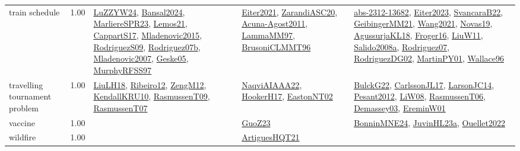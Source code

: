{\begin{longtable}{p{3cm}r>{\raggedright\arraybackslash}p{6cm}>{\raggedright\arraybackslash}p{6cm}>{\raggedright\arraybackslash}p{8cm}}
\index{train schedule}\index{ApplicationAreas!train schedule}train schedule &  1.00 & \hyperref[detail:LuZZYW24]{LuZZYW24}, \hyperref[detail:Bansal2024]{Bansal2024}, \hyperref[detail:MarliereSPR23]{MarliereSPR23}, \hyperref[detail:Lemos21]{Lemos21}, \hyperref[detail:CappartS17]{CappartS17}, \hyperref[detail:Mladenovic2015]{Mladenovic2015}, \hyperref[detail:RodriguezS09]{RodriguezS09}, \hyperref[detail:Rodriguez07b]{Rodriguez07b}, \hyperref[detail:Mladenovic2007]{Mladenovic2007}, \hyperref[detail:Geske05]{Geske05}, \hyperref[detail:MurphyRFSS97]{MurphyRFSS97} & \hyperref[detail:Eiter2021]{Eiter2021}, \hyperref[detail:ZarandiASC20]{ZarandiASC20}, \hyperref[detail:Acuna-Agost2011]{Acuna-Agost2011}, \hyperref[detail:LammaMM97]{LammaMM97}, \hyperref[detail:BrusoniCLMMT96]{BrusoniCLMMT96} & \hyperref[detail:abs-2312-13682]{abs-2312-13682}, \hyperref[detail:Eiter2023]{Eiter2023}, \hyperref[detail:SvancaraB22]{SvancaraB22}, \hyperref[detail:GeibingerMM21]{GeibingerMM21}, \hyperref[detail:Wang2021]{Wang2021}, \hyperref[detail:Novas19]{Novas19}, \hyperref[detail:AgussurjaKL18]{AgussurjaKL18}, \hyperref[detail:Froger16]{Froger16}, \hyperref[detail:LiuW11]{LiuW11}, \hyperref[detail:Salido2008a]{Salido2008a}, \hyperref[detail:Rodriguez07]{Rodriguez07}, \hyperref[detail:RodriguezDG02]{RodriguezDG02}, \hyperref[detail:MartinPY01]{MartinPY01}, \hyperref[detail:Wallace96]{Wallace96}\\
\index{travelling tournament problem}\index{ApplicationAreas!travelling tournament problem}travelling tournament problem &  1.00 & \hyperref[detail:LiuLH18]{LiuLH18}, \hyperref[detail:Ribeiro12]{Ribeiro12}, \hyperref[detail:ZengM12]{ZengM12}, \hyperref[detail:KendallKRU10]{KendallKRU10}, \hyperref[detail:RasmussenT09]{RasmussenT09}, \hyperref[detail:RasmussenT07]{RasmussenT07} & \hyperref[detail:NaqviAIAAA22]{NaqviAIAAA22}, \hyperref[detail:HookerH17]{HookerH17}, \hyperref[detail:EastonNT02]{EastonNT02} & \hyperref[detail:BulckG22]{BulckG22}, \hyperref[detail:CarlssonJL17]{CarlssonJL17}, \hyperref[detail:LarsonJC14]{LarsonJC14}, \hyperref[detail:Pesant2012]{Pesant2012}, \hyperref[detail:LiW08]{LiW08}, \hyperref[detail:RasmussenT06]{RasmussenT06}, \hyperref[detail:Demassey03]{Demassey03}, \hyperref[detail:EreminW01]{EreminW01}\\
\index{vaccine}\index{ApplicationAreas!vaccine}vaccine &  1.00 &  & \hyperref[detail:GuoZ23]{GuoZ23} & \hyperref[detail:BonninMNE24]{BonninMNE24}, \hyperref[detail:JuvinHL23a]{JuvinHL23a}, \hyperref[detail:Ouellet2022]{Ouellet2022}\\
\index{wildfire}\index{ApplicationAreas!wildfire}wildfire &  1.00 &  & \hyperref[detail:ArtiguesHQT21]{ArtiguesHQT21} & \\

\end{longtable}}
